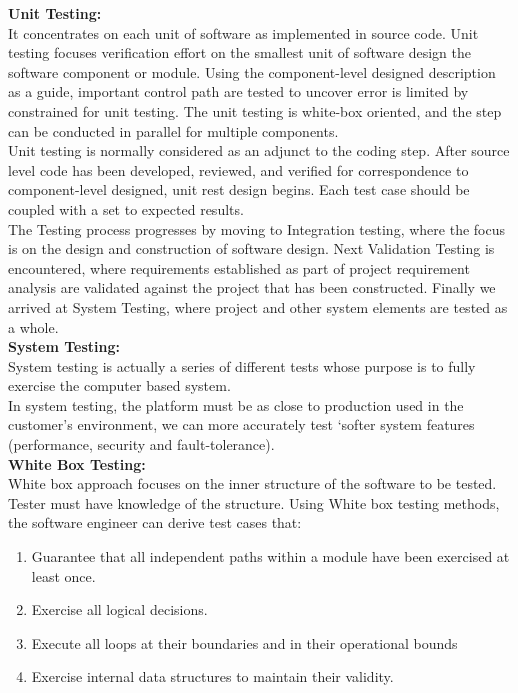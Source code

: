 \documentclass{SureshLimkar}
\begin{document}
\textbf{Unit Testing:}\\
\hspace{0.5 in}It concentrates on each unit of software as implemented in source code. Unit testing focuses verification effort on the smallest unit of software design the software component or module. Using the component-level designed description as a guide, important control path are tested to uncover error is limited by constrained for unit testing. The unit testing is white-box oriented, and the step can be conducted in parallel for multiple components.\\
\hspace{0.5 in}Unit testing is normally considered as an adjunct to the coding step. After source level code has been developed, reviewed, and verified for correspondence to component-level designed, unit rest design begins. Each test case should be coupled with a set to expected results.\\
\hspace{0.5 in}The Testing process progresses by moving to Integration testing, where the focus is on the design and construction of software design. Next Validation Testing is encountered, where requirements established as part of project requirement analysis are validated against the project that has been constructed. Finally we arrived at System Testing, where project and other system elements are tested as a whole.  \\

\textbf{System Testing:}\\
\hspace{0.5 in}System testing is actually a series of different tests whose purpose is to fully exercise the computer based system.\\
In system testing, the platform must be as close to production used in the customer’s environment, we can more accurately test ‘softer system features (performance, security and fault-tolerance).\\


\textbf{White Box Testing:}\\
\hspace{0.5 in}White box approach focuses on the inner structure of the software to be tested. Tester must have knowledge of the structure. Using White box testing methods, the software engineer can derive test cases that:
\begin{enumerate}
	\item Guarantee that all independent paths within a module have been exercised at least once.
	\item Exercise all logical decisions.
	\item Execute all loops at their boundaries and in their operational bounds
	\item Exercise internal data structures to maintain their validity.
\end{enumerate}
\end{document}
